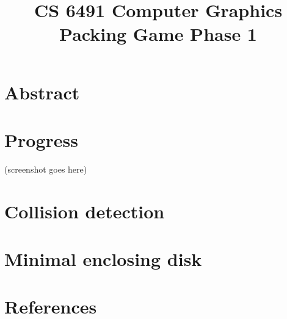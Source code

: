 \documentclass[11pt]{article}
\date{}
\title{CS 6491 Computer Graphics\\
  Packing Game Phase 1}
\begin{document}
\maketitle
\thispagestyle{empty}

\section{Abstract}

\section{Progress}

(screenshot goes here)

\section{Collision detection}

\section{Minimal enclosing disk}

\section{References}
\end{document}
